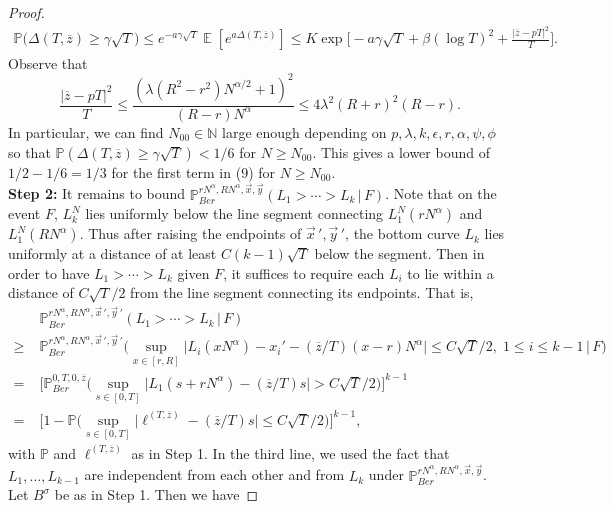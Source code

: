\documentclass[12pt]{article}
\DeclareMathOperator{\ex}{\mathbb{E}}
\begin{document}
\begin{proof}
	\begin{align*}
	\mathbb{P}\Big(\Delta(T,\overline{z}) \geq \gamma\sqrt{T}\Big) \leq e^{-a\gamma\sqrt{T}}\ex[e^{a\Delta(T,\overline{z})}] \leq K\exp\Big[-a\gamma\sqrt{T} + \beta(\log T)^2 + \frac{|\overline{z} - pT|^2}{T}\Big].
	\end{align*}
	Observe that
	\[
	\frac{|\overline{z} - pT|^2}{T} \leq \frac{(\lambda(R^2-r^2) N^{\alpha/2} + 1)^2}{(R-r)N^\alpha} \leq 4\lambda^2(R+r)^2(R-r).
	\]
	In particular, we can find $N_{00}\in\mathbb{N}$ large enough depending on $p,\lambda,k,\epsilon,r,\alpha,\psi,\phi$ so that $\mathbb{P}(\Delta(T,\overline{z})\geq \gamma\sqrt{T})<1/6$ for $N\geq N_{00}$. This gives a lower bound of $1/2 - 1/6 = 1/3$ for the first term in (9) for $N\geq N_{00}$.\\
	
	\noindent\textbf{Step 2:} It remains to bound $\mathbb{P}^{rN^\alpha, RN^\alpha,\vec{x},\vec{y}}_{Ber} (L_1 > \cdots > L_k\,|\,F)$. Note that on the event $F$, $L_k^N$ lies uniformly below the line segment connecting $L_1^N(rN^\alpha)$ and $L_1^N(RN^\alpha)$. Thus after raising the endpoints of $\vec{x}\,',\vec{y}\,'$, the bottom curve $L_k$ lies uniformly at a distance of at least $C(k-1)\sqrt{T}$ below the segment. Then in order to have $L_1 > \cdots > L_k$ given $F$, it suffices to require each $L_i$ to lie within a distance of $C\sqrt{T}/2$ from  the line segment connecting its endpoints. That is,
	\begin{align}
	&\mathbb{P}^{rN^\alpha, RN^\alpha,\vec{x}\,',\vec{y}\,'}_{Ber} (L_1 > \cdots > L_k\,|\,F) \nonumber\\
	\geq \; & \mathbb{P}^{rN^\alpha, RN^\alpha,\vec{x}\,',\vec{y}\,'}_{Ber} \Big(\sup_{x\in[r,R]} \big|L_i(xN^\alpha) - x_i' - (\overline{z}/T)(x-r)N^\alpha\big| \leq C\sqrt{T}/2, \;1\leq i\leq k-1\,\Big|\,F\Big) \nonumber\\
	= \; & \Big[ \mathbb{P}^{0,T,0,\overline{z}}_{Ber} \Big(\sup_{s\in[0,T]} \big|L_1(s+rN^\alpha) - (\overline{z}/T)s\big| > C\sqrt{T}/2\Big)\Big]^{k-1} \nonumber\\
	= \; & \Big[ 1 - \mathbb{P}\Big(\sup_{s\in[0,T]} \big|\ell^{(T,\overline{z})} - (\overline{z}/T)s\big| \leq C\sqrt{T}/2\Big)\Big]^{k-1}, \label{21avoidest}
	\end{align}
	with $\mathbb{P}$ and $\ell^{(T,\overline{z})}$ as in Step 1. In the third line, we used the fact that $L_1,\dots,L_{k-1}$ are independent from each other and from $L_k$ under $\mathbb{P}^{rN^\alpha, RN^\alpha,\vec{x},\vec{y}}_{Ber}$. Let $B^\sigma$ be as in Step 1. Then we have

\end{proof}
\end{document}
